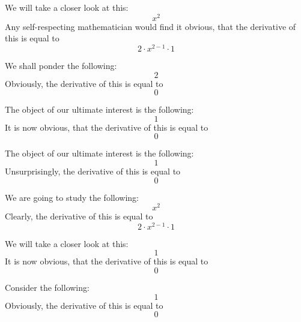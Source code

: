 \documentclass{article}
\begin{document}
We will take a closer look at this:
\begin{equation}
x ^{2 } 
\end{equation}
Any self-respecting mathematician would find it obvious, that the derivative of this is equal to
\begin{equation}
2 \cdot x ^{2 - 1 } \cdot 1 
\end{equation}

We shall ponder the following:
\begin{equation}
2 
\end{equation}
Obviously, the derivative of this is equal to
\begin{equation}
0 
\end{equation}

The object of our ultimate interest is the following:
\begin{equation}
1 
\end{equation}
It is now obvious, that the derivative of this is equal to
\begin{equation}
0 
\end{equation}

The object of our ultimate interest is the following:
\begin{equation}
1 
\end{equation}
Unsurprisingly, the derivative of this is equal to
\begin{equation}
0 
\end{equation}

We are going to study the following:
\begin{equation}
x ^{2 } 
\end{equation}
Clearly, the derivative of this is equal to
\begin{equation}
2 \cdot x ^{2 - 1 } \cdot 1 
\end{equation}

We will take a closer look at this:
\begin{equation}
1 
\end{equation}
It is now obvious, that the derivative of this is equal to
\begin{equation}
0 
\end{equation}

Consider the following:
\begin{equation}
1 
\end{equation}
Obviously, the derivative of this is equal to
\begin{equation}
0 
\end{equation}
\end{document}
